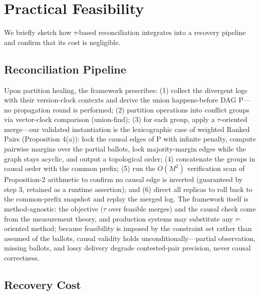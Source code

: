 \documentclass[11pt]{article}
\begin{document}
\section{Practical Feasibility}
We briefly sketch how $\tau $-based reconciliation integrates into a recovery pipeline and confirm that its cost is negligible.

\subsection{Reconciliation Pipeline}
Upon partition healing, the framework prescribes: (1) collect the divergent logs with their version-clock contexts and derive the union happens-before DAG P—no propagation round is performed; (2) partition operations into conflict groups via vector-clock comparison (union-find); (3) for each group, apply a $\tau $-oriented merge—our validated instantiation is the lexicographic case of weighted Ranked Pairs (Proposition 4(a)): lock the causal edges of P with infinite penalty, compute pairwise margins over the partial ballots, lock majority-margin edges while the graph stays acyclic, and output a topological order; (4) concatenate the groups in causal order with the common prefix; (5) run the $O(M^{2})$ verification scan of Proposition-2 arithmetic to confirm no causal edge is inverted (guaranteed by step 3, retained as a runtime assertion); and (6) direct all replicas to roll back to the common-prefix snapshot and replay the merged log. The framework itself is method-agnostic: the objective $(\tau $ over feasible merges) and the causal check come from the measurement theory, and production systems may substitute any $\tau $-oriented method; because feasibility is imposed by the constraint set rather than assumed of the ballots, causal validity holds unconditionally—partial observation, missing ballots, and lossy delivery degrade contested-pair precision, never causal correctness.

\subsection{Recovery Cost}
\begin{table}[t]
\centering
\caption{Table 7. Recovery-time breakdown for a large conflict group (M = 50, N = 10). Ranking time is measured (Fig. 6); the remaining phases are estimated for a typical in-memory state machine.}
\label{tbl:7}
\end{table}
\end{document}
